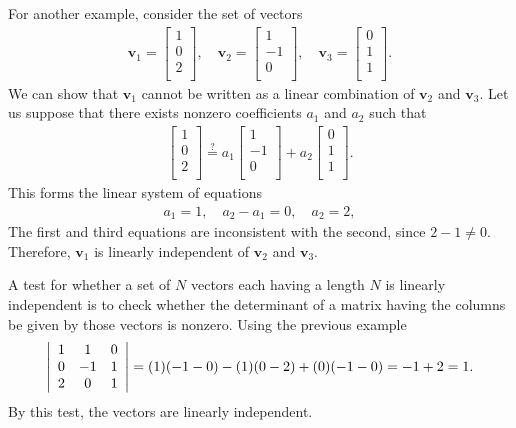 For another example, consider the set of vectors
\begin{align}
  \mathbf{v}_1 = \left[ \begin{array}{c} 1 \\  0 \\ 2 \\ \end{array} \right] , \quad
  \mathbf{v}_2 = \left[ \begin{array}{c} 1 \\ -1 \\ 0 \\ \end{array} \right] , \quad  
  \mathbf{v}_3 = \left[ \begin{array}{c} 0 \\  1 \\ 1 \\ \end{array} \right] .
\end{align}
We can show that $\mathbf{v}_1$ cannot be written as a linear combination of $\mathbf{v}_2$ and $\mathbf{v}_3$. Let us suppose that there exists nonzero coefficients $a_1$ and $a_2$ such that
\begin{align}
  \left[ \begin{array}{c} 1 \\  0 \\ 2 \\ \end{array} \right] \stackrel{?}{=} 
  a_1  \left[ \begin{array}{c} 1 \\ -1 \\ 0 \\ \end{array} \right] + a_2 \left[ \begin{array}{c} 0 \\  1 \\ 1 \\ \end{array} \right] . \nonumber
\end{align}
This forms the linear system of equations
\begin{align}
  a_1 = 1, \quad a_2 - a_1 = 0, \quad a_2 = 2, \nonumber
\end{align}
The first and third equations are inconsistent with the second, since $2 - 1 \ne 0$. Therefore, $\mathbf{v}_1$ is linearly independent of $\mathbf{v}_2$ and $\mathbf{v}_3$.

A test for whether a set of $N$ vectors each having a length $N$ is linearly independent is to check whether the determinant of a matrix having the columns be given by those vectors is nonzero. Using the previous example
\begin{align}
  \left| \begin{array}{c c c}  
    1 &  1 &  0 \\
    0 & -1 &  1 \\
    2 &  0 &  1 \\ \end{array} \right| = (1)(-1 - 0) - (1)(0 - 2) + (0)( -1 - 0 ) = -1 + 2 = 1 . \nonumber
\end{align}
By this test, the vectors are linearly independent.

